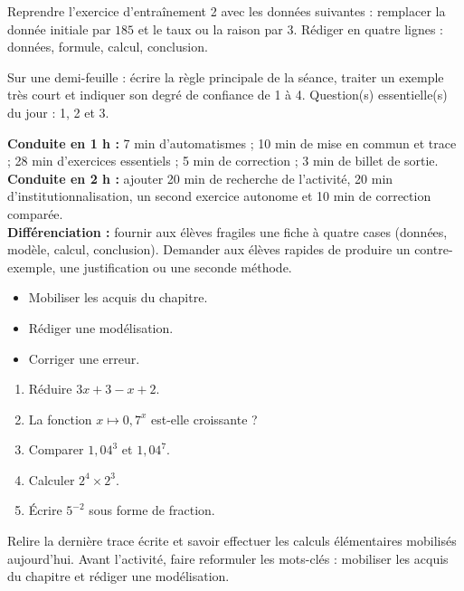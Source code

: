 
\begin{dm}Reprendre l'exercice d'entraînement 2 avec les données suivantes : remplacer la donnée initiale par $185$ et le taux ou la raison par $3$. Rédiger en quatre lignes : données, formule, calcul, conclusion.\end{dm}

\begin{sortie}Sur une demi-feuille : écrire la règle principale de la séance, traiter un exemple très court et indiquer son degré de confiance de 1 à 4. Question(s) essentielle(s) du jour : 1, 2 et 3.\end{sortie}

\ifprof
\begin{methode}
\textbf{Conduite en 1 h :} 7 min d'automatismes ; 10 min de mise en commun et trace ; 28 min d'exercices essentiels ; 5 min de correction ; 3 min de billet de sortie.\\
\textbf{Conduite en 2 h :} ajouter 20 min de recherche de l'activité, 20 min d'institutionnalisation, un second exercice autonome et 10 min de correction comparée.\\
\textbf{Différenciation :} fournir aux élèves fragiles une fiche à quatre cases (données, modèle, calcul, conclusion). Demander aux élèves rapides de produire un contre-exemple, une justification ou une seconde méthode.
\end{methode}
\fi
{}
\begin{objectifs}\begin{itemize}\item Mobiliser les acquis du chapitre.\item Rédiger une modélisation.\item Corriger une erreur.\end{itemize}\end{objectifs}
\begin{automatismes}\begin{enumerate}\item Réduire $3x+3-x+2$. \item La fonction $x\mapsto0{,}7^x$ est-elle croissante ? \item Comparer $1{,}04^3$ et $1{,}04^7$. \item Calculer $2^4\times2^3$. \item Écrire $5^{-2}$ sous forme de fraction. \end{enumerate}\end{automatismes}
\begin{prerequis}Relire la dernière trace écrite et savoir effectuer les calculs élémentaires mobilisés aujourd'hui. Avant l'activité, faire reformuler les mots-clés : mobiliser les acquis du chapitre et rédiger une modélisation.\end{prerequis}

